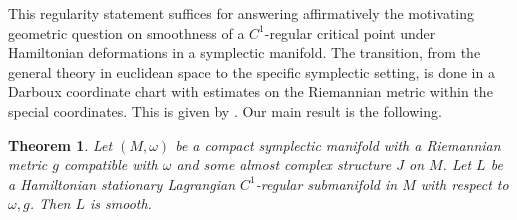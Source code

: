 \documentclass[12pt,leqno]{amsart}%
\newtheorem{theorem}{Theorem}[section]
\theoremstyle{plain}
\numberwithin{equation}{section}
\theoremstyle{definition}
\begin{document}


This regularity statement suffices for answering affirmatively the motivating
geometric question on smoothness of a $C^{1}$-regular critical point under
Hamiltonian deformations in a symplectic manifold. The transition, from the
general theory in euclidean space to the specific symplectic setting, is done
in a Darboux coordinate chart with estimates on the Riemannian metric within the
special coordinates. This is given by \cite[Prop. 3.2 and Prop. 3.4]{JLS}. Our
main result is the following.

\begin{theorem}
\label{main2:Intro} Let $(M,\omega)$ be a compact symplectic manifold with a
Riemannian metric $g$ compatible with $\omega$ and some almost complex
structure $J$ on $M$. Let $L$ be a Hamiltonian stationary Lagrangian $C^{1}%
$-regular submanifold in $M$ with respect to $\omega,g$. Then $L$ is smooth.
\end{theorem}

\begin{comment}
In fact, Theorem \ref{main1:Intro} allows us to draw a more general geometric
statement by lowering regularity assumption on $L$ in Theorem
\ref{main2:Intro} from $C^{1}$ to Lipschitz continuous with small ``slope". To
describe this, let $(M,h)$ be a Riemannian $2n$-manifold and let $Gr_{n}(TM)$
stand for the Grassmann bundle of $n$-dimensional subspaces in the
$2n$-dimensional tangent spaces of $M$, equipped on this vector bundle with
the Riemannian metric arising from $h$, see section 4 for more detail. Then,
we have

\begin{theorem}
\label{main3:Intro} Let $(M,\omega,h)$ be a symplectic manifold. Suppose that
$L$ is a Lipschitz continuous Hamiltonian stationary Lagrangian submanifold
(possibly open but without boundary) embedded in $M$. Suppose that at $p\in L$
the tangent plane $T_{p}L$ exists. Then, there is a constant $c_{0}$, such
that, if the tangent planes (where defined) of $L$ lies in a ball of radius
$c_{0}$ centred at $T_{p}L$ in $Gr_{n}(TM)$, then $L$ is smooth near $p$.
\end{theorem}

As critical points of the volume functional on submanifolds, Theorems
\ref{main2:Intro} and \ref{main3:Intro} may be compared to some of the
classical statements for minimal submanifolds. For minimal submanifolds
(stationary for all smooth variations with compact support), a classical
theorem of Morrey states: $C^{1}$-regular minimal submanifolds are smooth
\cite[Theorem 10.7.1]{MorreyBook}. On the other hand, Lawson-Osserman
\cite{LO} constructed enlightening examples demonstrating existence of
Lipschitz minimal submanifolds (even graphical) that are not $C^{1}$. More
generally, the regularity theory developed in \cite{GM} for second order
elliptic systems does not seem to have direct impact on our single equation of
higher order on a scalar function.

\end{comment}
\end{document}
